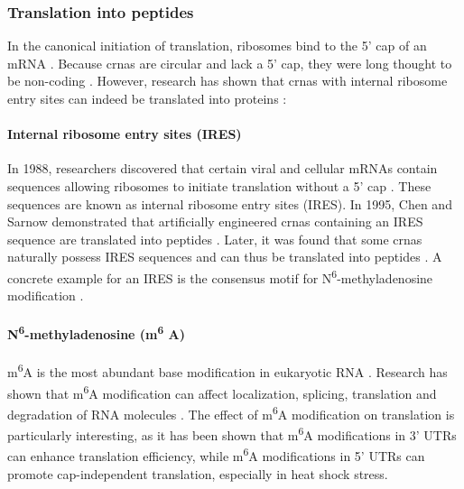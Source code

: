 \subsubsection{Translation into peptides}
In the canonical initiation of translation, ribosomes bind to the 5' cap of an
mRNA \supercite{hinnebusch_mechanism_2012}.
Because \gls{crna}s are circular and lack a 5' cap, they were long thought to
be non-coding \supercite{bao_regulatory_2019,greene_circular_2017}.
However, research has shown that \gls{crna}s with internal ribosome entry sites
can indeed be translated into proteins \supercite{chen_expanding_2020}:

\paragraph{Internal ribosome entry sites (IRES)} In 1988, researchers
discovered that certain viral and cellular mRNAs contain sequences allowing
ribosomes to initiate translation without a 5' cap
\supercite{pelletier_internal_1988, jang_segment_1988}.
These sequences are known as internal ribosome entry sites (IRES).
In 1995, Chen and Sarnow demonstrated that artificially engineered \gls{crna}s
containing an IRES sequence are translated into peptides
\supercite{chen_initiation_1995}.
Later, it was found that some \gls{crna}s naturally possess IRES sequences and
can thus be translated into peptides
\supercite{chen_expanding_2020,legnini_circ-znf609_2017,pamudurti_translation_2017}.
A concrete example for an IRES is the consensus motif for
N\textsuperscript{6}-methyladenosine modification
\supercite{yang_extensive_2017}.

\paragraph{N\textsuperscript{6}-methyladenosine (m\textsuperscript{6}
    A)}  m\textsuperscript{6}A is the most abundant base modification in eukaryotic
RNA \supercite{yang_extensive_2017,li_pivotal_2014,wei_methylated_1975}.
Research has shown that m\textsuperscript{6}A modification can affect
localization, splicing, translation and degradation of RNA molecules
\supercite{yue_rna_2015,meyer_dynamic_2014}.
The effect of m\textsuperscript{6}A modification on translation is particularly
interesting, as it has been shown that m\textsuperscript{6}A modifications in
3' UTRs can enhance translation
efficiency\supercite{wang_n6-methyladenosine_2015}, while m\textsuperscript{6}A
modifications in 5' UTRs can promote cap-independent translation, especially in
heat shock stress\supercite{zhou_dynamic_2015,meyer_5_2015}.

